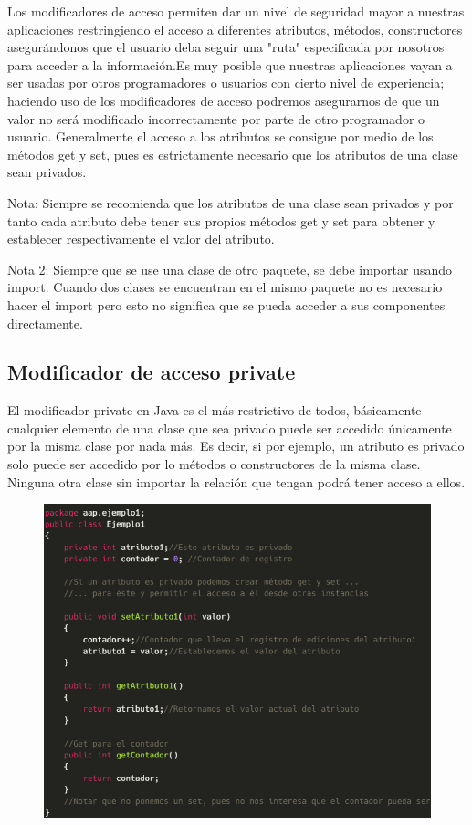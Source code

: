 \documentclass[12pt,a4paper]{report}
\begin{document}
{Los modificadores de acceso permiten dar un nivel de seguridad mayor a nuestras aplicaciones restringiendo el acceso a diferentes atributos, métodos, constructores asegurándonos que el usuario deba seguir una "ruta" especificada por nosotros para acceder a la información.Es muy posible que nuestras aplicaciones vayan a ser usadas por otros programadores o usuarios con cierto nivel de experiencia; haciendo uso de los modificadores de acceso podremos asegurarnos de que un valor no será modificado incorrectamente por parte de otro programador o usuario. Generalmente el acceso a los atributos se consigue por medio de los métodos get y set, pues es estrictamente necesario que los atributos de una clase sean privados.

Nota: Siempre se recomienda que los atributos de una clase sean privados y por tanto cada atributo debe tener sus propios métodos get y set para obtener y establecer respectivamente el valor del atributo.

Nota 2: Siempre que se use una clase de otro paquete, se debe importar usando import. Cuando dos clases se encuentran en el mismo paquete no es necesario hacer el import pero esto no significa que se pueda acceder a sus componentes directamente.

\subsection*{Modificador de acceso private}
El modificador private en Java es el más restrictivo de todos, básicamente cualquier elemento de una clase que sea privado puede ser accedido únicamente por la misma clase por nada más. Es decir, si por ejemplo, un atributo es privado solo puede ser accedido por lo métodos o constructores de la misma clase. Ninguna otra clase sin importar la relación que tengan podrá tener acceso a ellos.
\begin{figure}[hbtp]
\centering
\includegraphics[scale=0.4]{2.PNG}
\end{figure}
}
\end{document}
